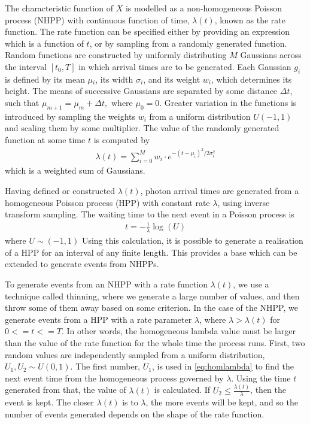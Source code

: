 \documentclass[a4paper,11pt]{article}
\begin{document}
The characteristic function of $X$ is modelled as a non-homogeneous Poisson
process (NHPP) with continuous function of time, $\lambda(t)$, known as the rate
function. The rate function can be specified either by providing an expression
which is a function of $t$, or by sampling from a randomly generated
function. Random functions are constructed by uniformly distributing $M$
Gaussians across the interval $\left[t_0,T\right]$ in which arrival times are to
be generated. Each Gaussian $g_i$ is defined by its mean $\mu$$_i$, its width
$\sigma$$_i$, and its weight $w_i$, which determines its height. The means of
successive Gaussians are separated by some distance $\Delta t$, such that
$\mu_{m+1}=\mu_m + \Delta t,\text{ where } \mu_0=0$. Greater variation in the
functions is introduced by sampling the weights $w_i$ from a uniform
distribution $U(-1,1)$ and scaling them by some multiplier. The value of the
randomly generated function at some time $t$ is computed by
\begin{align}
   \lambda(t) = \sum_{i=0}^M w_i\cdot e^{-(t-\mu_i)^2/2\sigma_i^2}
\end{align}
which is a weighted sum of Gaussians. 

Having defined or constructed $\lambda(t)$, photon arrival times are generated
from a homogeneous Poisson process (HPP) with constant rate $\lambda$, using
inverse transform sampling. The waiting time to the next event in a Poisson
process is \cite{1998art}
\begin{align}\label{eq:homlambda}
t=-\frac{1}{\lambda}\log(U)
\end{align}
where $U\sim (-1,1)$
Using this calculation, it is possible to generate a realisation of a HPP for
an interval of any finite length. This provides a base which can be extended
to generate events from NHPPs.

To generate events from an NHPP with a rate function $\lambda(t)$, we use a
technique called thinning, where we generate a large number of values, and
then throw some of them away based on some criterion. In the case of the
NHPP, we generate events from a HPP with a rate parameter $\lambda$, where
$\lambda>\lambda(t)$ for $0<=t<=T$. In other words, the homogeneous lambda
value must be larger than the value of the rate function for the whole time
the process runs. First, two random values are independently sampled from a
uniform distribution, $U_1,U_2\sim U(0,1)$. The first number, $U_1$, is used
in \eqref{eq:homlambda} to find the next event time from the homogeneous
process governed by $\lambda$. Using the time $t$ generated from that, the
value of $\lambda(t)$ is calculated. If $U_2\leq\frac{\lambda(t)}{\lambda}$,
then the event is kept. The closer $\lambda(t)$ is to $\lambda$, the more
events will be kept, and so the number of events generated depends on the
shape of the rate function.
\end{document}
